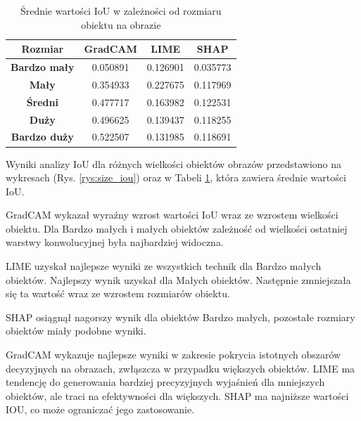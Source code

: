\begin{table}[h]
	\centering
	\begin{tabular}{|c|c|c|c|}
		\hline
		\textbf{Rozmiar}     & \textbf{GradCAM} & \textbf{LIME} & \textbf{SHAP} \\
		\hline
		\textbf{Bardzo mały} & 0.050891         & 0.126901      & 0.035773      \\
		\hline
		\textbf{Mały}        & 0.354933         & 0.227675      & 0.117969      \\
		\hline
		\textbf{Średni}      & 0.477717         & 0.163982      & 0.122531      \\
		\hline
		\textbf{Duży}        & 0.496625         & 0.139437      & 0.118255      \\
		\hline
		\textbf{Bardzo duży} & 0.522507         & 0.131985      & 0.118691      \\
		\hline
	\end{tabular}
	\caption{Średnie wartości IoU w zależności od rozmiaru obiektu na obrazie}
	\label{tab:size_iou}
\end{table}

Wyniki analizy IoU dla różnych wielkości obiektów obrazów przedstawiono na wykresach (Rys. \ref{rys:size_iou}) oraz w Tabeli \ref{tab:size_iou}, która zawiera średnie wartości IoU.

GradCAM wykazał wyraźny wzrost wartości IoU wraz ze wzrostem wielkości obiektu.
Dla Bardzo małych i małych obiektów zależność od wielkości ostatniej warstwy konwolucyjnej była najbardziej widoczna.

LIME uzyskał najlepsze wyniki ze wszystkich technik dla Bardzo małych obiektów.
Najlepszy wynik uzyskał dla Małych obiektów.
Następnie zmniejszała się ta wartość wraz ze wzrostem rozmiarów obiektu.

SHAP osiągnął nagorszy wynik dla obiektów Bardzo małych, pozostałe rozmiary obiektów miały podobne wyniki.

GradCAM wykazuje najlepsze wyniki w zakresie pokrycia istotnych obszarów decyzyjnych na obrazach, zwłąszcza w przypadku większych obiektów.
LIME ma tendencję do generowania bardziej precyzyjnych wyjaśnień dla mniejszych obiektów, ale traci na efektywności dla większych.
SHAP ma najniższe wartości IOU, co może ograniczać jego zastosowanie.

\vspace{1cm}



